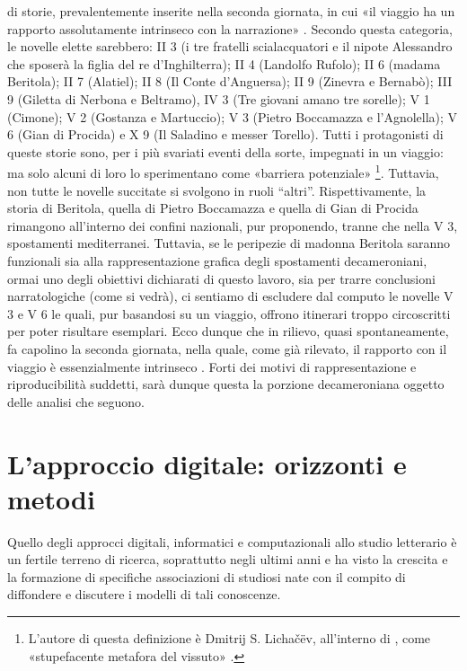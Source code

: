 di storie, prevalentemente inserite nella seconda giornata, in cui «il
viaggio ha un rapporto assolutamente intrinseco con la narrazione»
\autocite[p.~549]{asor1992}. Secondo questa categoria, le novelle elette
sarebbero: II 3 (i tre fratelli scialacquatori e il nipote Alessandro
che sposerà la figlia del re d'Inghilterra); II 4 (Landolfo Rufolo); II
6 (madama Beritola); II 7 (Alatiel); II 8 (Il Conte d'Anguersa); II 9
(Zinevra e Bernabò); III 9 (Giletta di Nerbona e Beltramo), IV 3 (Tre
giovani amano tre sorelle); V 1 (Cimone); V 2 (Gostanza e Martuccio); V
3 (Pietro Boccamazza e l'Agnolella); V 6 (Gian di Procida) e X 9 (Il
Saladino e messer Torello). Tutti i protagonisti di queste storie sono,
per i più svariati eventi della sorte, impegnati in un viaggio: ma solo
alcuni di loro lo sperimentano come «barriera potenziale» \footnote{L'autore
  di questa definizione è Dmitrij S. Lichačëv, all'interno di
  \autocite[pp.~26-39]{lotman1973}, come «stupefacente metafora del
  vissuto» \autocite[p.~550]{asor1992}.}. Tuttavia, non tutte le novelle
succitate si svolgono in ruoli ``altri''. Rispettivamente, la storia di
Beritola, quella di Pietro Boccamazza e quella di Gian di Procida
rimangono all'interno dei confini nazionali, pur proponendo, tranne che
nella V 3, spostamenti mediterranei. Tuttavia, se le peripezie di
madonna Beritola saranno funzionali sia alla rappresentazione grafica
degli spostamenti decameroniani, ormai uno degli obiettivi dichiarati di
questo lavoro, sia per trarre conclusioni narratologiche (come si
vedrà), ci sentiamo di escludere dal computo le novelle V 3 e V 6 le
quali, pur basandosi su un viaggio, offrono itinerari troppo
circoscritti per poter risultare esemplari. Ecco dunque che in rilievo,
quasi spontaneamente, fa capolino la seconda giornata, nella quale, come
già rilevato, il rapporto con il viaggio è essenzialmente intrinseco
\autocite{zatti2004}. Forti dei motivi di rappresentazione e
riproducibilità suddetti, sarà dunque questa la porzione decameroniana
oggetto delle analisi che seguono.

\section{L'approccio digitale: orizzonti e
metodi}\label{lapproccio-digitale-orizzonti-e-metodi}

Quello degli approcci digitali, informatici e computazionali allo studio
letterario è un fertile terreno di ricerca, soprattutto negli ultimi
anni e ha visto la crescita e la formazione di specifiche associazioni
di studiosi nate con il compito di diffondere e discutere i modelli di
tali conoscenze.

